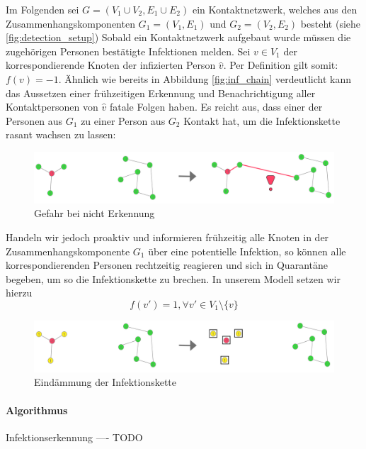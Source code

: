 \documentclass[12pt]{article}
\begin{document}
Im Folgenden sei $G=(V_1 \cup V_2, E_1 \cup E_2)$ ein Kontaktnetzwerk, welches aus den Zusammenhangskomponenten $G_1=(V_1, E_1)$ und $G_2=(V_2, E_2)$ besteht (siehe \ref{fig:detection_setup})
Sobald ein Kontaktnetzwerk aufgebaut wurde müssen die zugehörigen Personen bestätigte Infektionen melden. Sei $v \in V_1$ der korrespondierende Knoten der infizierten Person $\hat{v}$. Per Definition gilt somit: 
$f(v) = -1$. Ähnlich wie bereits in Abbildung \ref{fig:inf_chain} verdeutlicht kann das Aussetzen einer frühzeitigen Erkennung und Benachrichtigung aller Kontaktpersonen von $\hat{v}$ fatale Folgen haben. Es reicht aus, dass einer der Personen aus $G_1$ zu einer Person aus $G_2$ Kontakt hat, um die Infektionskette rasant wachsen zu lassen:

\begin{figure}[h]
    \centering
    \includegraphics[width=\textwidth]{res/detection_infected}
    \caption{Gefahr bei nicht Erkennung}
    \label{fig:detection_infected}
\end{figure}

Handeln wir jedoch proaktiv und informieren frühzeitig alle Knoten in der Zusammenhangskomponente $G_1$ über eine potentielle Infektion, so können alle korrespondierenden Personen rechtzeitig reagieren und sich in Quarantäne begeben, um so die Infektionskette zu brechen. In unserem Modell setzen wir hierzu
\[f(v') = 1, \forall v' \in V_1 \setminus \{v\}\]

\begin{figure}[h]
    \centering
    \includegraphics[width=\textwidth]{res/detection_proactive}
    \caption{Eindämmung der Infektionskette}
    \label{fig:detection_infected}
\end{figure}

\paragraph{Algorithmus} Infektionserkennung
---- TODO
\end{document}
